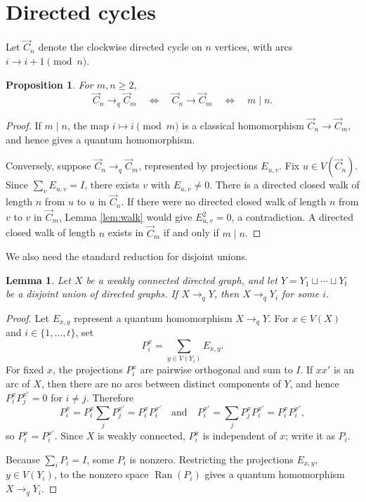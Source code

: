 \documentclass[11pt]{amsart}
\theoremstyle{plain}
\newtheorem{lemma}[theorem]{Lemma}
\newtheorem{proposition}[theorem]{Proposition}
\theoremstyle{definition}
\newcommand{\toq}{\to_q}
\newcommand{\Cyc}{\overrightarrow{C}}
\newcommand{\Id}{I}
\begin{document}
\section{Directed cycles}

Let $\Cyc_n$ denote the clockwise directed cycle on $n$ vertices, with arcs $i\to i+1\pmod n$.

\begin{proposition}\label{prop:cycles}
For $m,n\ge 2$,
\[
   \Cyc_n\toq \Cyc_m
   \quad\Longleftrightarrow\quad
   \Cyc_n\to \Cyc_m
   \quad\Longleftrightarrow\quad
   m\mid n.
\]
\end{proposition}

\begin{proof}
If $m\mid n$, the map $i\mapsto i\pmod m$ is a classical homomorphism $\Cyc_n\to\Cyc_m$, and hence gives a quantum homomorphism.

Conversely, suppose $\Cyc_n\toq \Cyc_m$, represented by projections $E_{u,v}$.  Fix $u\in V(\Cyc_n)$.  Since $\sum_v E_{u,v}=\Id$, there exists $v$ with $E_{u,v}\ne 0$.  There is a directed closed walk of length $n$ from $u$ to $u$ in $\Cyc_n$.  If there were no directed closed walk of length $n$ from $v$ to $v$ in $\Cyc_m$, Lemma \ref{lem:walk} would give $E_{u,v}^2=0$, a contradiction.  A directed closed walk of length $n$ exists in $\Cyc_m$ if and only if $m\mid n$.
\end{proof}

We also need the standard reduction for disjoint unions.

\begin{lemma}\label{lem:connected-to-component}
Let $X$ be a weakly connected directed graph, and let $Y=Y_1\sqcup\cdots\sqcup Y_t$ be a disjoint union of directed graphs.  If $X\toq Y$, then $X\toq Y_i$ for some $i$.
\end{lemma}

\begin{proof}
Let $E_{x,y}$ represent a quantum homomorphism $X\toq Y$.  For $x\in V(X)$ and $i\in\{1,\ldots,t\}$, set
\[
   P_i^x=\sum_{y\in V(Y_i)}E_{x,y}.
\]
For fixed $x$, the projections $P_i^x$ are pairwise orthogonal and sum to $\Id$.  If $xx'$ is an arc of $X$, then there are no arcs between distinct components of $Y$, and hence $P_i^xP_j^{x'}=0$ for $i\ne j$.  Therefore
\[
   P_i^x=P_i^x\sum_j P_j^{x'}=P_i^xP_i^{x'}
   \quad\text{and}\quad
   P_i^{x'}=\sum_j P_j^xP_i^{x'}=P_i^xP_i^{x'},
\]
so $P_i^x=P_i^{x'}$.  Since $X$ is weakly connected, $P_i^x$ is independent of $x$; write it as $P_i$.

Because $\sum_iP_i=\Id$, some $P_i$ is nonzero.  Restricting the projections $E_{x,y}$, $y\in V(Y_i)$, to the nonzero space $\operatorname{Ran}(P_i)$ gives a quantum homomorphism $X\toq Y_i$.
\end{proof}
\end{document}
